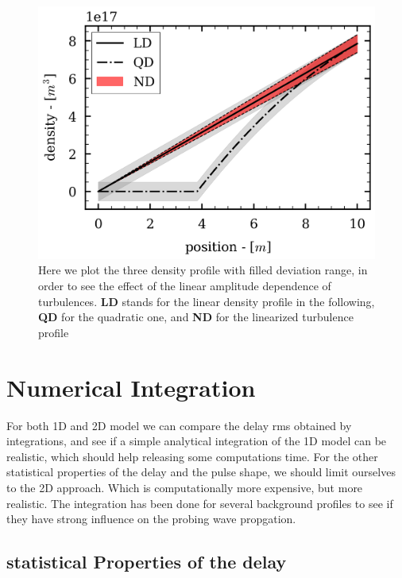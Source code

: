 \documentclass[11pt,a4paper]{report}
\begin{document}
\begin{multicols}{2}
    \begin{figure}[H]
        \centering
        \includegraphics[width=1\linewidth]{./figures/background_density.png}
        \caption{Here we plot the three density profile with filled deviation range, in order to see the effect of the linear amplitude dependence of turbulences. \textbf{LD} stands for the linear density profile in the following, \textbf{QD} for the quadratic one, and \textbf{ND} for the linearized turbulence profile}
        \label{fig:barrier}
    \end{figure}
    \section{Numerical Integration}
    For both 1D and 2D model we can compare the delay rms obtained by integrations, and see if a simple analytical integration of the 1D model can be realistic, which should help releasing some computations time. For the other statistical properties of the delay and the pulse shape, we should limit ourselves to the 2D approach.
    Which is computationally more expensive, but more realistic. The integration has been done for several background profiles to see if they have strong influence on the probing wave propgation.
    \subsection{statistical Properties of the delay}

\end{multicols}
\end{document}
